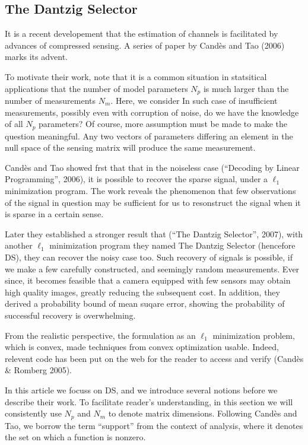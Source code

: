 \subsection{The Dantzig Selector}

It is a recent developement that the estimation of channels is facilitated by advances of compressed sensing.
A series of paper by Cand\`es and Tao (2006) marks its advent.

To motivate their work, note that it is a common situation in statsitical applications that the number of model parameters \(N_p\) is much larger than the number of measurements \(N_m\).
Here, we consider
%
%
In such case of insufficient measurements, possibly even with corruption of noise, do we have the knowledge of all \(N_p\) parameters?
Of course, more assumption must be made to make the question meaningful.
Any two vectors of parameters differing an element in the null space of the sensing matrix will produce the same measurement.

Cand\`es and Tao showed frst that that in the noiseless case (``Decoding by Linear Programming'', 2006), it is possible to recover the sparse signal, under a \(\ell_1\) minimization program.
The work reveals the phenomenon that few observations of the signal in question may be sufficient for us to resonstruct the signal when it is sparse in a certain sense.

Later they established a stronger result that (``The Dantzig Selector'', 2007), with another \(\ell_1\) minimization program they named The Dantzig Selector (hencefore DS), they can recover the noisy case too.
Such recovery of signals is possible, if we make a few carefully constructed, and seemingly random measurements.
Ever since, it becomes feasible that a camera equipped with few sensors may obtain high quality images, greatly reducing the subsequent cost.
In addition, they derived a probability bound of mean suqare error, showing the probability of successful recovery is overwhelming.

From the realistic perspective, the formulation as an \(\ell_1\) minimization problem, which is convex, made techniques from convex optimization usable.
Indeed, relevent code has been put on the web for the reader to access and verify (Cand\`es \& Romberg 2005).

In this article we focuss on DS, and we introduce several notions before we describe their work.
To facilitate reader's understanding, in this section we will consistently use \(N_p\) and \(N_m\) to denote matrix dimensions.
Following Cand\`es and Tao, we borrow the term ``support'' from the context of analysis, where it denotes the set on which a function is nonzero.

